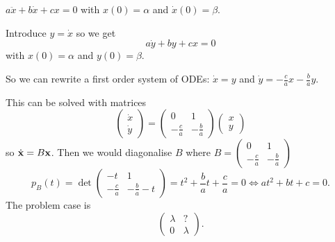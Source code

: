 \documentclass[10pt, a4paper]{article}
\begin{document}
\begin{problem}
    $a\ddot{x} + b\dot{x} + cx = 0$ with $x(0) = \alpha$ and $\dot{x}(0) = \beta$.

    Introduce $y = \dot{x}$ so we get
    \[
    a\dot{y} + by + cx = 0
    \]
    with $x(0) = \alpha$ and $y(0) = \beta$.

    So we can rewrite a first order system of ODEs:
    $\dot{x} = y$ and $\dot{y} = -\frac{c}{a}x - \frac{b}{a}y$.

    This can be solved with matrices
    \[
    \begin{pmatrix}
        \dot{x} \\ \dot{y}
    \end{pmatrix} = \begin{pmatrix}
        0 & 1 \\
        -\frac{c}{a} & -\frac{b}{a}
    \end{pmatrix}\begin{pmatrix}
        x \\ y
    \end{pmatrix}
    \]
    so
    $\dot{\mathbf{x}} = B\mathbf{x}$.
    Then we would diagonalise $B$ where $B = \begin{pmatrix}
        0 & 1 \\
        -\frac{c}{a} & -\frac{b}{a}
    \end{pmatrix}$
    \[
    p_B(t) = \det\begin{pmatrix}
        -t & 1 \\ -\frac{c}{a} & -\frac{b}{a} - t
    \end{pmatrix} = t ^ 2 + \frac{b}{a}t + \frac{c}{a} = 0 \iff at ^ 2 + bt + c = 0.
    \]
    The problem case is
    \[
    \begin{pmatrix}
        \lambda & ? \\ 0 & \lambda
    \end{pmatrix}.
    \]
\end{problem}
\end{document}

